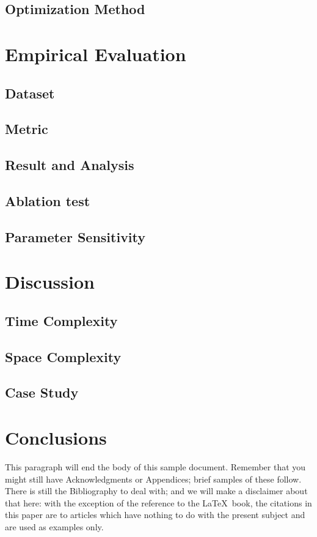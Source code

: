 \documentclass{sig-alternate-05-2015}
\begin{document}
\subsection{Optimization Method}

\section{Empirical Evaluation}
\subsection{Dataset}
\subsection{Metric}
\subsection{Result and Analysis}
\subsection{Ablation test}
\subsection{Parameter Sensitivity}
\section{Discussion}
\subsection{Time Complexity}
\subsection{Space Complexity}
\subsection{Case Study}
\section{Conclusions}
This paragraph will end the body of this sample document.
Remember that you might still have Acknowledgments or
Appendices; brief samples of these
follow.  There is still the Bibliography to deal with; and
we will make a disclaimer about that here: with the exception
of the reference to the \LaTeX\ book, the citations in
this paper are to articles which have nothing to
do with the present subject and are used as
examples only.
\end{document}
